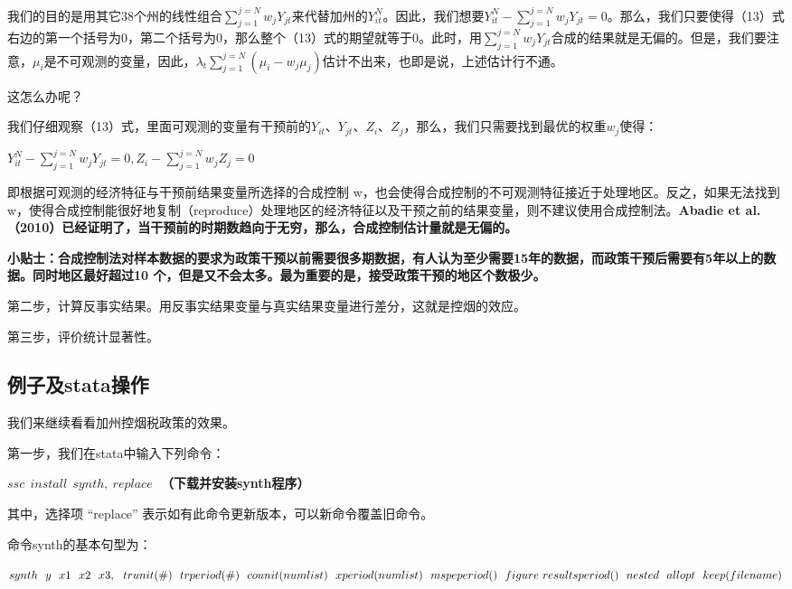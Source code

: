 \documentclass[cn,12pt,math=newtx,citestyle=gb7714-2015,bibstyle=gb7714-2015]{elegantbook}
\begin{document}
	我们的目的是用其它38个州的线性组合$\sum_{j=1}^{j=N}w_jY_{jt}$来代替加州的$Y_{it}^N$。因此，我们想要$Y_{it}^N-\sum_{j=1}^{j=N}w_jY_{jt}=0$。那么，我们只要使得（13）式右边的第一个括号为0，第二个括号为0，那么整个（13）式的期望就等于0。此时，用$\sum_{j=1}^{j=N}w_jY_{jt}$合成的结果就是无偏的。但是，我们要注意，$\mu_i$是不可观测的变量，因此，$\lambda_t\sum_{j=1}^{j=N}(\mu_i-w_j\mu_j)$估计不出来，也即是说，上述估计行不通。
	
	这怎么办呢？
	
	我们仔细观察（13）式，里面可观测的变量有干预前的$Y_{it}$、$Y_{jt}$、$Z_i$、$Z_j$，那么，我们只需要找到最优的权重$w_j$使得：
	\begin{center}
		$Y_{it}^N-\sum_{j=1}^{j=N}w_jY_{jt}=0,Z_i-\sum_{j=1}^{j=N}w_jZ_j=0$
	\end{center}
	
	即根据可观测的经济特征与干预前结果变量所选择的合成控制 w，也会使得合成控制的不可观测特征接近于处理地区。反之，如果无法找到 w，使得合成控制能很好地复制（reproduce）处理地区的经济特征以及干预之前的结果变量，则不建议使用合成控制法。\textbf{Abadie et al.（2010）已经证明了，当干预前的时期数趋向于无穷，那么，合成控制估计量就是无偏的。}
	
	\textbf{小贴士：合成控制法对样本数据的要求为政策干预以前需要很多期数据，有人认为至少需要15年的数据，而政策干预后需要有5年以上的数据。同时地区最好超过10 个，但是又不会太多。最为重要的是，接受政策干预的地区个数极少。}
	
	第二步，计算反事实结果。用反事实结果变量与真实结果变量进行差分，这就是控烟的效应。
	
	第三步，评价统计显著性。
	
	\subsection{例子及stata操作}
	
	我们来继续看看加州控烟税政策的效果。
	
	第一步，我们在stata中输入下列命令：
	
	\textbf{$ssc~~install~~synth,~replace~~~$（下载并安装synth程序）}
	
	其中，选择项 “replace” 表示如有此命令更新版本，可以新命令覆盖旧命令。
	
	命令synth的基本句型为：
	
	\textbf{$synth~~y~~x1~~x2~~x3 ,~~trunit(\#)~~trperiod(\#)~~counit(numlist)~~xperiod(numlist)~~mspeperiod()~~figure~~\\
		resultsperiod()~~nested~~allopt~~keep(filename)$}
	
\end{document}

